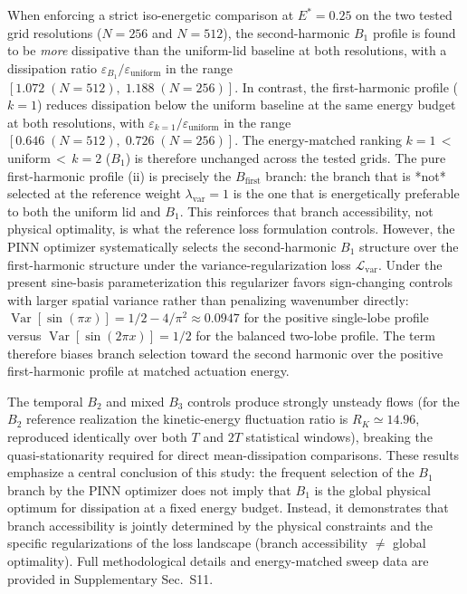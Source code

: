 \documentclass[a4paper,11pt]{article}
\begin{document}
When enforcing a strict iso-energetic comparison at \(E^*=0.25\) on the two tested
grid resolutions (\(N=256\) and \(N=512\)), the second-harmonic \(B_1\) profile is
found to be \emph{more} dissipative than the uniform-lid baseline at both
resolutions, with a dissipation ratio
\(\varepsilon_{B_1}/\varepsilon_{\mathrm{uniform}}\) in the range
\(\left[1.072\;(N=512),\;1.188\;(N=256)\right]\).
In contrast, the first-harmonic profile (\(k=1\)) reduces dissipation below the
uniform baseline at the same energy budget at both resolutions, with
\(\varepsilon_{k=1}/\varepsilon_{\mathrm{uniform}}\) in the range
\(\left[0.646\;(N=512),\;0.726\;(N=256)\right]\).
The energy-matched ranking $k=1$\,$<$\,uniform\,$<$\,$k=2$ ($B_1$) is therefore
unchanged across the tested grids. The pure first-harmonic profile (ii) is
precisely the \(B_{\mathrm{first}}\) branch: the branch that is *not* selected at
the reference weight \(\lambda_{\mathrm{var}}=1\) is the one that is energetically
preferable to both the uniform lid and \(B_1\). This reinforces that branch
accessibility, not physical optimality, is what the reference loss formulation
controls.
However, the PINN optimizer systematically selects the second-harmonic \(B_1\)
structure over the first-harmonic structure under the variance-regularization
loss \(\mathcal{L}_{\mathrm{var}}\). Under the present sine-basis parameterization
this regularizer favors sign-changing controls with larger spatial variance rather
than penalizing wavenumber directly:
\(\operatorname{Var}[\sin(\pi x)]=1/2-4/\pi^2\approx0.0947\) for the positive
single-lobe profile versus \(\operatorname{Var}[\sin(2\pi x)]=1/2\) for the
balanced two-lobe profile. The term therefore biases branch selection toward the
second harmonic over the positive first-harmonic profile at matched actuation
energy.

The temporal \(B_2\) and mixed \(B_3\) controls produce strongly unsteady flows
(for the \(B_2\) reference realization the kinetic-energy fluctuation ratio is
\(R_K\simeq14.96\), reproduced identically over both \(T\) and \(2T\) statistical
windows), breaking the quasi-stationarity required for direct mean-dissipation
comparisons. These results emphasize a central conclusion of this study: the
frequent selection of the \(B_1\) branch by the PINN optimizer does not imply
that \(B_1\) is the global physical optimum for dissipation at a fixed energy budget.
Instead, it demonstrates that branch accessibility is jointly determined by the
physical constraints and the specific regularizations of the loss landscape
(branch accessibility \(\neq\) global optimality). Full methodological details and
energy-matched sweep data are provided in Supplementary Sec.~S11.
\end{document}

